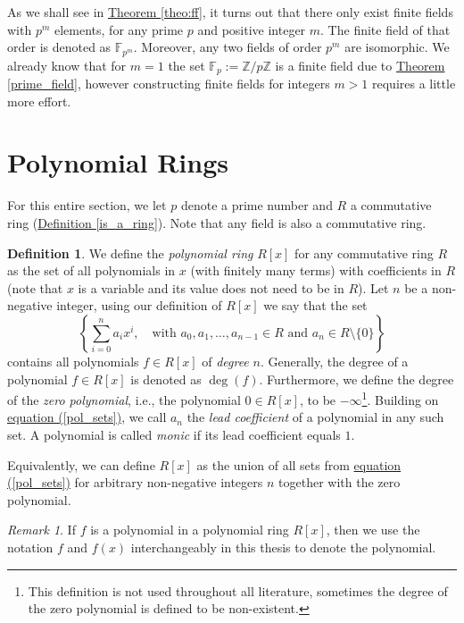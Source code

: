 \documentclass[openany, a4paper, 10pt]{book}
\theoremstyle{plain}
\theoremstyle{plain}
\theoremstyle{plain}
\theoremstyle{definition}
\newtheorem{definition}[theorem]{Definition}
\theoremstyle{plain}
\theoremstyle{definition}
\theoremstyle{remark}
\newtheorem*{remark}{Remark}
\renewcommand{\eqref}[1]{\hyperref[#1]{equation (\ref{#1})}}
\newcommand{\defref}[1]{\hyperref[#1]{Definition \ref{#1}}}
\newcommand{\theoref}[1]{\hyperref[#1]{Theorem \ref{#1}}}
\begin{document}
As we shall see in \theoref{theo:ff}, it turns out that there only exist finite fields with $p^m$ elements, for any prime $p$ and positive integer $m$.
The finite field of that order is denoted as $\mathbb F_{p^m}$.
Moreover, any two fields of order $p^m$ are isomorphic.
We already know that for $m=1$ the set
$\mathbb F_p:= \mathbb Z/p\mathbb Z$ is a finite field due to \theoref{prime_field},
however constructing finite fields for integers $m > 1$ requires a little more effort.


\section{Polynomial Rings}\label{sec:pol_rings}
For this entire section, we let $p$ denote a prime number and $R$ a commutative ring (\defref{is_a_ring}).
Note that any field is also a commutative ring.

\begin{definition}\label{pol_ring}
    We define the \textit{polynomial ring} $R[x]$ for any commutative ring $R$ as the set of all polynomials in $x$ (with finitely many terms) with coefficients in $R$ (note that $x$ is a variable and its value does not need to be in $R$).
    Let $n$ be a non-negative integer, using our definition of $R[x]$ we say that the set
    \begin{equation}\label{pol_sets}
        \left\{ \sum_{i=0}^n a_i x^i, \quad \text{with } a_0, a_1, \dots, a_{n-1} \in R \text{ and } a_n \in R\setminus \{ 0 \} \right\}
    \end{equation}
    contains all polynomials $f \in R[x]$ of \textit{degree} $n$.
    Generally, the degree of a polynomial $f \in R[x]$ is denoted as $\deg(f)$.
    Furthermore, we define the degree of the \textit{zero polynomial}, i.e., the polynomial $0 \in R[x]$, to be $-\infty$\footnote[1]{
        This definition is not used throughout all literature,
        sometimes the degree of the zero polynomial is defined to be non-existent.
    }.
    Building on \eqref{pol_sets}, we call $a_n$ the \textit{lead coefficient} of a polynomial in any such set.
    A polynomial is called \textit{monic} if its lead coefficient equals $1$.

    Equivalently, we can define $R[x]$ as the union of all sets from \eqref{pol_sets} for arbitrary non-negative integers $n$ together with the zero polynomial.
\end{definition}
\begin{remark}
    If $f$ is a polynomial in a polynomial ring $R[x]$, then we use the notation
    $f$ and $f(x)$ interchangeably in this thesis to denote the polynomial.
\end{remark}
\end{document}
